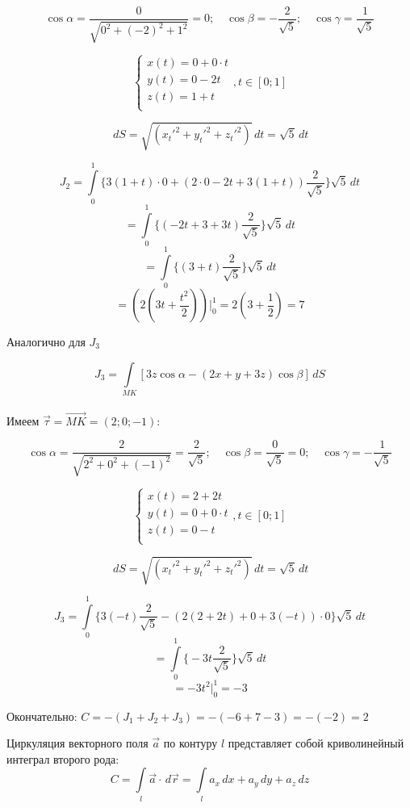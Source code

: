 \documentclass[12pt]{article}
\begin{document}
\begin{enumerate}[wide, labelwidth=!, labelindent=0pt]
		$$\cos\alpha = \frac{0}{\sqrt{0^2 + (-2)^2+1^2}} = 0;\quad \cos\beta = -\frac{2}{\sqrt{5}};\quad \cos\gamma = \frac{1}{\sqrt{5}}$$
		
		$$\begin{cases}
			x(t) = 0 + 0\cdot t\\
			y(t) = 0 -2t\\
			z(t) = 1 + t\\
		\end{cases}, t \in [0;1]$$
		
		$$\,dS = \sqrt{(x_t'^2 + y_t'^2 + z_t'^2 )} \,dt = \sqrt{5} \,dt$$  

		$$J_2 = \int \limits_{0}^1 \bigg\{ 3(1 + t)\cdot 0 + (2 \cdot 0 -2t  + 3(1 + t))\frac{2}{\sqrt{5}}  \bigg\}\sqrt{5} \,dt$$
		$$= \int \limits_{0}^1 \bigg\{ ( -2t  + 3 + 3t)\frac{2}{\sqrt{5}}  \bigg\}\sqrt{5} \,dt$$
		$$= \int \limits_{0}^1 \bigg\{  ( 3 + t)\frac{2}{\sqrt{5}}  \bigg\}\sqrt{5} \,dt$$
		$$= (2 (3 t + \frac{t^2}{2}))\Big|_0^{1} = 2 (3  + \frac{1}{2}) = 7$$

		Аналогично для $ J_3 $ 

		$$J_3 = \int \limits_{MK} [3z\cos\alpha -(2x + y + 3z)\cos\beta]\,dS$$\\
		Имеем $ \vec{\tau} = \vec{MK} = (2;0;-1) $:

		$$\cos\alpha = \frac{2}{\sqrt{2^2+0^2+(-1)^2}} = \frac{2}{\sqrt{5}};\quad \cos\beta = \frac{0}{\sqrt{5}}=0;\quad \cos\gamma = -\frac{1}{\sqrt{5}}$$
		
		$$\begin{cases}
			x(t) = 2 + 2t\\
			y(t) = 0 + 0\cdot t\\
			z(t) = 0 -t\\
		\end{cases}, t \in [0;1]$$
		
		$$\,dS = \sqrt{(x_t'^2 + y_t'^2 + z_t'^2 )} \,dt = \sqrt{5} \,dt$$  

		$$J_3 = \int \limits_{0}^1 \bigg\{ 3(-t)\frac{2}{\sqrt{5}} - (2(2 + 2t) + 0 + 3(-t))\cdot0 \bigg\}\sqrt{5} \,dt$$
		$$= \int \limits_{0}^1 \bigg\{ -3t\frac{2}{\sqrt{5}}  \bigg\}\sqrt{5} \,dt$$
		$$= -3t^2\Big|_0^{1} = -3$$

		Окончательно: $ C = -(J_1 + J_2+J_3)  = -(-6 + 7 -3) = -(-2) = 2$
		
		Циркуляция векторного поля $ \vec{a} $ по контуру $ l $ представляет собой криволинейный интеграл второго рода:
		$$ C = \int \limits_{l} \vec{a} \cdot \,d\vec{r} = \int \limits_{l} a_x \,d x + a_y \,d y + a_z \,d z$$
		

\end{enumerate}
\end{document}
